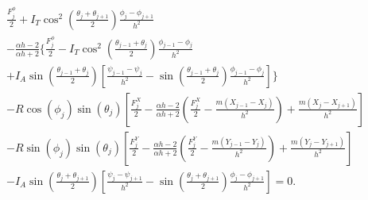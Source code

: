 \documentclass{aims}
\numberwithin{equation}{section}
\theoremstyle{definition}
\begin{document}
\begin{equation}\label{eq:last_equation_of_the_integrator}
    \begin{split}
        &\frac{F^{\phi}_j}{2}+ I_T \cos^2\left(\frac{\theta_j + \theta_{j+1}}{2}\right) \frac{\phi_j - \phi_{j+1}}{h^2}\\
        &- \frac{\alpha h - 2}{\alpha h+2} \Bigg\{ \frac{F^{\phi}_j}{2} - I_T \cos^2\left(\frac{\theta_{j-1} + \theta_j}{2}\right) \frac{\phi_{j-1} - \phi_j}{h^2}\\
  &+I_A \sin\left(\frac{\theta_{j-1} + \theta_j}{2}\right) \left[\frac{\psi_{j-1} - \psi_j}{h^2} - \sin\left(\frac{\theta_{j-1} + \theta_j}{2}\right) \frac{\phi_{j-1} - \phi_j}{h^2}\right] \Bigg\}\\
 &- R \cos(\phi_j) \sin(\theta_j) \left[\frac{F^X_j}{2} - \frac{\alpha h - 2}{\alpha h+2} \left(\frac{F^X_j}{2} - \frac{m (X_{j-1} - X_j)}{h^2}\right) + \frac{m (X_j - X_{j+1})}{h^2}\right]\\
 &- R \sin(\phi_j) \sin(\theta_j) \left[\frac{F^Y_j}{2} - \frac{\alpha h - 2}{\alpha h+2} \left(\frac{F^Y_j}{2} - \frac{m (Y_{j-1} - Y_j)}{h^2}\right) + \frac{m (Y_j - Y_{j+1})}{h^2}\right]\\
 & -
  I_A \sin\left(\frac{\theta_j + \theta_{j+1}}{2}\right) \left[\frac{\psi_j - \psi_{j+1}}{h^2} -
  \sin\left(\frac{\theta_j + \theta_{j+1}}{2}\right) \frac{\phi_j - \phi_{j+1}}{h^2}\right]= 0.
    \end{split}
\end{equation}
\end{document}
